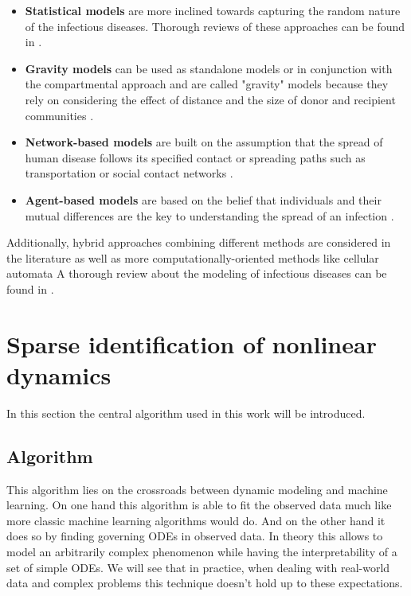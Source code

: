\documentclass[12pt, letterpaper]{article}
\begin{document}
\begin{itemize}

\item \textbf{Statistical models} are more inclined towards capturing the random nature of the infectious diseases. 
Thorough reviews of these approaches can be found in \cite{}.

\item \textbf{Gravity models} can be used as standalone models or in conjunction with the compartmental approach and are called "gravity" models because they rely on considering the effect of distance and the size of donor and recipient communities \cite{}. 

\item \textbf{Network-based models} are built on the assumption that the spread of human disease follows its specified contact or spreading paths such as transportation or social contact networks \cite{}.

\item \textbf{Agent-based models} are based on the belief that individuals and their mutual differences are the key to understanding the spread of an infection \cite{}.
\end{itemize}

Additionally, hybrid approaches combining different methods are considered in the literature \cite{} as well as more computationally-oriented methods like cellular automata \cite{}
A thorough review about the modeling of infectious diseases can be found in \cite{}.

\section{Sparse identification of nonlinear dynamics}\label{sec:sindy}

In this section the central algorithm used in this work will be introduced. 

\subsection{Algorithm}

This algorithm lies on the crossroads between dynamic modeling and machine learning. 
On one hand this algorithm is able to fit the observed data much like more classic machine learning algorithms would do. 
And on the other hand it does so by finding governing ODEs in observed data. 
In theory this allows to model an arbitrarily complex phenomenon while having the interpretability of a set of simple ODEs. 
We will see that in practice, when dealing with real-world data and complex problems this technique doesn't hold up to these expectations.
\end{document}

